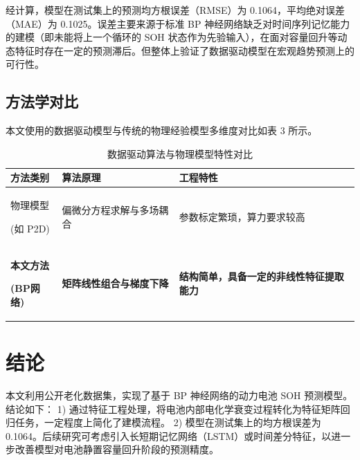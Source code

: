 \documentclass[twocolumn,10pt,a4paper,twoside]{ctexart}
\begin{document}
经计算，模型在测试集上的预测均方根误差（RMSE）为 0.1064，平均绝对误差（MAE）为 0.1025。误差主要来源于标准 BP 神经网络缺乏对时间序列记忆能力的建模（即未能将上一个循环的 SOH 状态作为先验输入），在面对容量回升等动态特征时存在一定的预测滞后。但整体上验证了数据驱动模型在宏观趋势预测上的可行性。

\subsection{方法学对比}
本文使用的数据驱动模型与传统的物理经验模型多维度对比如表 3 所示。

\begin{table}[htbp]
    \centering
    \caption{数据驱动算法与物理模型特性对比}
    \label{tab:comparison}
    \begin{tabular}{@{}p{1.8cm}p{2.5cm}p{3.2cm}@{}}
        \toprule
        \textbf{方法类别}                     & \textbf{算法原理}        & \textbf{工程特性}                \\
        \midrule
        物理模型\par (如 P2D)                  & 偏微分方程求解与多场耦合         & 参数标定繁琐，算力要求较高                \\
        \textbf{本文方法}\par \textbf{(BP网络)} & \textbf{矩阵线性组合与梯度下降} & \textbf{结构简单，具备一定的非线性特征提取能力} \\
        \bottomrule
    \end{tabular}
\end{table}

\section{结论}
本文利用公开老化数据集，实现了基于 BP 神经网络的动力电池 SOH 预测模型。结论如下：
1) 通过特征工程处理，将电池内部电化学衰变过程转化为特征矩阵回归任务，一定程度上简化了建模流程。
2) 模型在测试集上的均方根误差为 0.1064。后续研究可考虑引入长短期记忆网络（LSTM）或时间差分特征，以进一步改善模型对电池静置容量回升阶段的预测精度。

\balance
\end{document}
